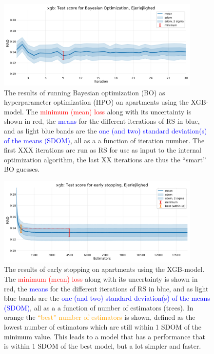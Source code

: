 \documentclass[a4paper, twoside, nobib]{tufte-book}
\newcommand{\q}[1]{``#1''}
\begin{document}
\begin{figure}
  \includegraphics[width=0.9\textwidth, trim=0 0 0 40, clip]{figures/housing/Ejerlejlighed_v18_cut_all_Ncols_all_xgb_score_over_time_BO.pdf}
  \caption[Hyperparameter optimization: Bayesian optimization results]
          {The results of running Bayesian optimization (BO) as hyperparameter optimization (HPO) on apartments using the XGB-model. The \textcolor{red}{minimum (mean) loss} along with its uncertainty is shown in red, the \textcolor{blue}{means} for the different iterations of RS in blue, and as light blue bands are the \textcolor{blue}{one (and two) standard deviation(s) of the means (SDOM)}, all as a a function of iteration number. The first XXX iterations are run as RS for use as input to the internal optimization algorithm, the last XX iterations are thus the \q{smart} BO guesses.
          } 
  \label{fig:h:BO_xgb_apartment}
\end{figure}


\begin{figure}
  \includegraphics[width=0.9\textwidth, trim=0 0 0 40, clip]{figures/housing/Ejerlejlighed_v18_cut_all_Ncols_all_xgb_early_stopping_fig.pdf}
  \caption[Early Stopping results]
          {The results of early stopping on apartments using the XGB-model. The \textcolor{red}{minimum (mean) loss} along with its uncertainty is shown in red, the \textcolor{blue}{means} for the different iterations of RS in blue, and as light blue bands are the \textcolor{blue}{one (and two) standard deviation(s) of the means (SDOM)}, all as a a function of number of estimators (trees). In orange the \textcolor{orange}{\q{best} number of estimators} is shown, defined as the lowest number of estimators which are still within 1 SDOM of the minimum value. This leads to a model that has a performance that is within 1 SDOM of the best model, but a lot simpler and faster.  
          } 
  \label{fig:h:early_stopping}
\end{figure}
\end{document}
